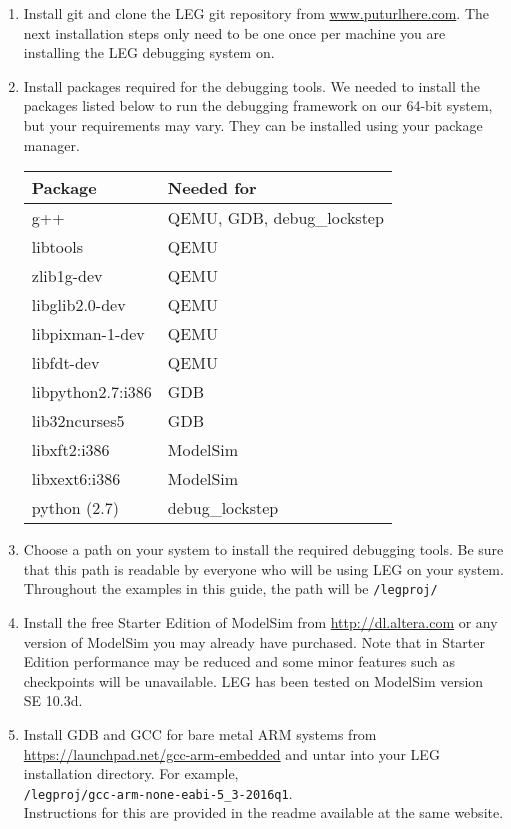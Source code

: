 \begin{enumerate}
\item Install git and clone the LEG git repository from \url{www.puturlhere.com}. 
The next installation steps only need to be one once per machine you are installing the LEG debugging system on.

\item Install packages required for the debugging tools. We needed to install the packages listed below to run the debugging framework on our 64-bit system, but your requirements may vary.
They can be installed using your package manager.

\begin{tabular}{|l|l|}
\hline 
\textbf{Package} & \textbf{Needed for} \\\hline
g++ & QEMU, GDB, debug\_lockstep \\\hline
libtools & QEMU \\\hline
zlib1g-dev & QEMU \\\hline
libglib2.0-dev & QEMU \\\hline
libpixman-1-dev & QEMU \\\hline
libfdt-dev & QEMU \\\hline
libpython2.7:i386 & GDB \\\hline
lib32ncurses5 & GDB \\\hline
libxft2:i386 & ModelSim \\\hline
libxext6:i386 & ModelSim \\\hline
python (2.7)& debug\_lockstep \\\hline
\end{tabular}

\item Choose a path on your system to install the required debugging tools. 
Be sure that this path is readable by everyone who will be using LEG on your system.
Throughout the examples in this guide, the path will be \texttt{/legproj/}

\item Install the free Starter Edition of ModelSim from \url{http://dl.altera.com} or any version of ModelSim you may already have purchased. 
Note that in Starter Edition performance may be reduced and some minor features such as checkpoints will be unavailable. 
LEG has been tested on ModelSim version SE 10.3d. 

\item Install GDB and GCC for bare metal ARM systems from \url{https://launchpad.net/gcc-arm-embedded} and untar into your LEG installation directory. 
For example, \\\texttt{/legproj/gcc-arm-none-eabi-5\_3-2016q1}.\\
Instructions for this are provided in the readme available at the same website.


\end{enumerate}
